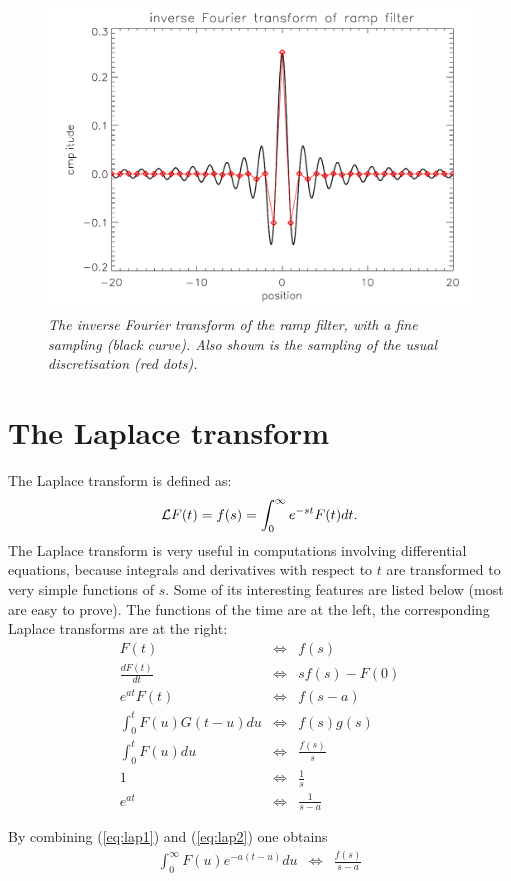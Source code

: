 \begin{figure}[tb]
\centering
\includegraphics[width=\figmedium]{figs/fig_rampfilter_app.pdf}
\caption{\label{fig:rampapp} \emph{The inverse Fourier transform of
    the ramp filter, with a fine sampling (black curve). Also shown is
    the sampling of the usual discretisation (red dots).}}
\end{figure}


\newpage
\section{The Laplace transform \label{app:laplace}}
The Laplace transform is defined as:
\begin{equation}
  {\cal L} F(t) = f(s) = \int_0^\infty e^{-st} F(t) dt.
\end{equation}
%
The Laplace transform is very useful in computations involving differential
equations, because integrals and derivatives with respect to $t$ are
transformed to very simple functions of $s$. Some of its interesting features
are listed below (most are easy to prove). The functions of the time are at
the left, the corresponding Laplace transforms are at the right:
\begin{eqnarray}
F(t)                        & \Longleftrightarrow & f(s) \\
\frac{dF(t)}{dt}            & \Longleftrightarrow & s f(s) - F(0) \\
e^{at} F(t)                 & \Longleftrightarrow & f(s - a)\\
\int_0^t F(u) G(t - u) du   & \Longleftrightarrow & f(s) g(s) \label{eq:lap1}\\
\int_0^t F(u) du            & \Longleftrightarrow & \frac{f(s)}{s}\\
1                           & \Longleftrightarrow & \frac{1}{s}\\
e^{at}                      & \Longleftrightarrow & \frac{1}{s - a} \label{eq:lap2}
\end{eqnarray}

By combining (\ref{eq:lap1}) and (\ref{eq:lap2}) one obtains
\begin{eqnarray}
\int_0^\infty F(u) e^{-a(t - u)} du & \Longleftrightarrow & \frac{f(s)}{s-a}
\end{eqnarray}